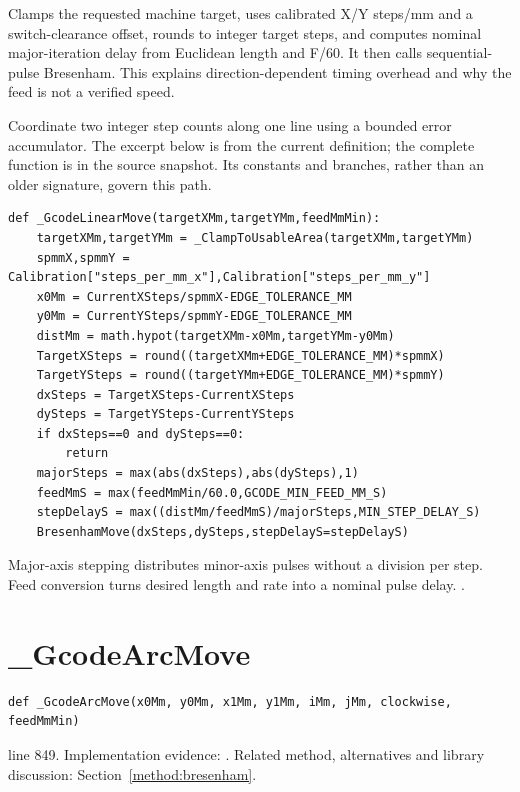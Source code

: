 Clamps the requested machine target, uses calibrated X/Y steps/mm and a switch-clearance offset, rounds to integer target steps, and computes nominal major-iteration delay from Euclidean length and F/60. It then calls sequential-pulse Bresenham. This explains direction-dependent timing overhead and why the feed is not a verified speed.


Coordinate two integer step counts along one line using a bounded error accumulator. The excerpt below is from the current definition; the complete function is in the source snapshot. Its constants and branches, rather than an older signature, govern this path.


\begin{lstlisting}[style=plain]
def _GcodeLinearMove(targetXMm,targetYMm,feedMmMin):
    targetXMm,targetYMm = _ClampToUsableArea(targetXMm,targetYMm)
    spmmX,spmmY = Calibration["steps_per_mm_x"],Calibration["steps_per_mm_y"]
    x0Mm = CurrentXSteps/spmmX-EDGE_TOLERANCE_MM
    y0Mm = CurrentYSteps/spmmY-EDGE_TOLERANCE_MM
    distMm = math.hypot(targetXMm-x0Mm,targetYMm-y0Mm)
    TargetXSteps = round((targetXMm+EDGE_TOLERANCE_MM)*spmmX)
    TargetYSteps = round((targetYMm+EDGE_TOLERANCE_MM)*spmmY)
    dxSteps = TargetXSteps-CurrentXSteps
    dySteps = TargetYSteps-CurrentYSteps
    if dxSteps==0 and dySteps==0:
        return
    majorSteps = max(abs(dxSteps),abs(dySteps),1)
    feedMmS = max(feedMmMin/60.0,GCODE_MIN_FEED_MM_S)
    stepDelayS = max((distMm/feedMmS)/majorSteps,MIN_STEP_DELAY_S)
    BresenhamMove(dxSteps,dySteps,stepDelayS=stepDelayS)
\end{lstlisting}
Major-axis stepping distributes minor-axis pulses without a division per step. Feed conversion turns desired length and rate into a nominal pulse delay. \cite{bresenham1965,a4988datasheet,kernelgpio}.


\section{\_GcodeArcMove}\label{fn:reproduce:-GcodeArcMove}
\begin{lstlisting}[style=sig]
def _GcodeArcMove(x0Mm, y0Mm, x1Mm, y1Mm, iMm, jMm, clockwise, feedMmMin)
\end{lstlisting}
 line 849. Implementation evidence: \cite{code2026}. Related method, alternatives and library discussion: Section~\ref{method:bresenham}.


